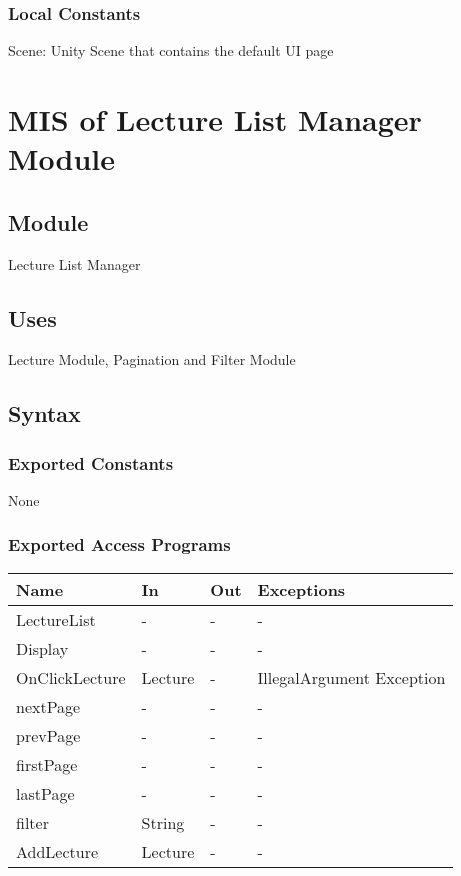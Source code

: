 \documentclass[12pt, titlepage]{article}
\begin{document}
\subsubsection{Local Constants}

Scene: Unity Scene that contains the default UI page

\newpage

\section{MIS of Lecture List Manager Module} \label{mLL}

\subsection{Module}

Lecture List Manager

\subsection{Uses}

Lecture Module, Pagination and Filter Module

\subsection{Syntax}

\subsubsection{Exported Constants}
None

\subsubsection{Exported Access Programs}
\begin{center}
\begin{tabular}{p{4cm} p{2cm} p{4cm} p{4cm}}
\hline
\textbf{Name} & \textbf{In} & \textbf{Out} & \textbf{Exceptions} \\
\hline
LectureList & - & - & -\\
Display & - & - & - \\
OnClickLecture & Lecture & - & IllegalArgument Exception\\ 
nextPage & - & - &  -\\
prevPage & - & - &  -\\
firstPage & - & - &  -\\
lastPage & - & - &  -\\
filter & String & - & -\\
AddLecture & Lecture & - & - \\
\hline
\end{tabular}
\end{center}
\end{document}
